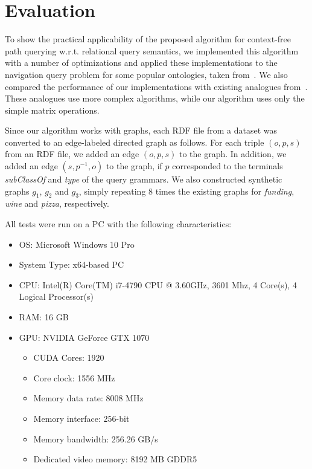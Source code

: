 \section{Evaluation}
\label{section_evaluation}

To show the practical applicability of the proposed algorithm for context-free path querying w.r.t. relational query semantics, we implemented this algorithm with a number of optimizations and applied these implementations to the navigation query problem for some popular ontologies, taken from~\cite{RDF}. We also compared the performance of our implementations with existing analogues from~\cite{GLL,RDF}. These analogues use more complex algorithms, while our algorithm uses only the simple matrix operations.

Since our algorithm works with graphs, each RDF file from a dataset was converted to an edge-labeled directed graph as follows. For each triple $(o,p,s)$ from an RDF file, we added an edge $(o,p,s)$ to the graph. In addition, we added an edge $(s,p^{-1},o)$ to the graph, if $p$ corresponded to the terminals \emph{subClassOf} and \emph{type} of the query grammars. We also constructed synthetic graphs $g_1$, $g_2$ and $g_3$, simply repeating $8$ times the existing graphs for \emph{funding}, \emph{wine} and \emph{pizza}, respectively.

All tests were run on a PC with the following characteristics:

\begin{itemize}
    \item OS: Microsoft Windows 10 Pro
    \item System Type: x64-based PC
    \item CPU: Intel(R) Core(TM) i7-4790 CPU @ 3.60GHz, 3601 Mhz, 4 Core(s), 4 Logical Processor(s)
    \item RAM: 16 GB
    \item GPU: NVIDIA GeForce GTX 1070
    \begin{itemize}
        \item CUDA Cores:		1920 
        \item Core clock:		1556 MHz 
        \item Memory data rate:	8008 MHz
        \item Memory interface:	256-bit 
        \item Memory bandwidth:	256.26 GB/s
        \item Dedicated video memory:	8192 MB GDDR5
    \end{itemize}
\end{itemize}

